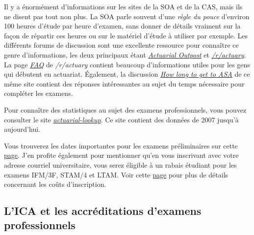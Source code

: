 Il y a énormément d'informations sur les sites de la SOA et de la CAS, mais ils ne disent pas tout non plus. La SOA parle souvent  d'une \emph{règle du pouce} d'environ 100 heures d'étude par heure d'examen, sans donner de détails vraiment sur la façon de répartir ces heures ou sur le matériel d'étude à utiliser par exemple. Les différents forums de discussion sont une excellente ressource pour connaître ce genre d'informations, les deux principaux étant \href{http://www.actuarialoutpost.com/}{\emph{Actuarial Outpost}} et \href{https://www.reddit.com/r/actuary}{\emph{/r/actuary}}. La page \href{https://www.reddit.com/r/actuary/wiki/index#wiki_the_frequently_asked_questions_.28faqs.29}{\emph{FAQ}} de \emph{/r/actuary} contient beaucoup d'informations utiles pour les gens qui débutent en actuariat. Également, la discussion \href{https://www.reddit.com/r/actuary/comments/1enzdd/how_long_to_get_to_asa_is_two_years_possible/}{\emph{How long to get to ASA}} de ce même site contient des réponses intéressantes au sujet du temps nécessaire pour compléter les examens. \vspace{\baselineskip}

Pour connaître des statistiques au sujet des examens professionnels, vous pouvez consulter le site \href{http://actuarial-lookup.com/}{\emph{actuarial-lookup}}. Ce site contient des données de 2007 jusqu'à aujourd'hui. \vspace{\baselineskip}

Vous trouverez les dates importantes pour les examens préliminaires sur cette \href{https://www.soa.org/education/exam-req/exam-day-info/edu-2019-cbt-test-schedule/}{page}. J'en profite également pour mentionner qu'en vous inscrivant avec votre adresse courriel universitaire, vous serez éligible à un rabais étudiant pour les examens IFM/3F, STAM/4 et LTAM. Voir cette \href{https://soa.org/Education/Exam-Req/Syllabus-Study-Materials/Exam-and-Module-Fees.aspx}{page} pour plus de détails concernant les coûts d'inscription. \vspace{\baselineskip}

\newpage

\subsection*{L'ICA et les accréditations d'examens professionnels}
\label{subsec:ica}

